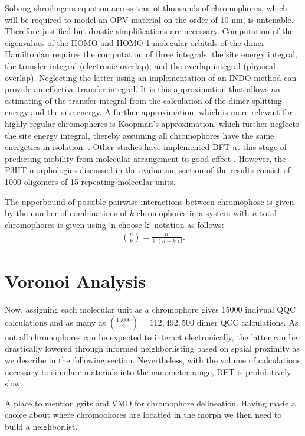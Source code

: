 Solving shrodingers equation across tens of thousands of 
chromophores, which will be required to model an OPV material on the order of 10 nm, is untenable. Therefore
justified but drastic simplifications are necessary. Computation of the eigenvalues of the HOMO and HOMO-1
molecular orbitals of the dimer Hamiltonian requires the computation of three integrals: 
the site energy integral, the transfer integral (electronic overlap), and the overlap integral (physical
overlap). Neglecting the latter using an implementation of an INDO method can provide an effective transfer
integral. It is this approximation that allows an estimating of the transfer integral from the calculation of
the dimer splitting energy and the site energy. A further approximation, which is more relevant for highly regular chromopheres is Koopman's
approximation, which further neglects the site energy integral, thereby assuming all chromophores have the same
energetics in isolation.  \cite{Huang2005b}. Other studies have implemented DFT at this stage of predicting
mobility from molecular arrangement to good effect \cite{Deng2004}. However, the P3HT morphologies discussed in the evaluation section of the results
consist of 1000 oligomers of 15 repeating molecular units. 

The upperbound of possible pairwise interactions between chromophose is given by the number of combinations of
$k$ chromophores in a system with $n$ total chromophores is given using `n choose k' notation as follows:
\begin{align}
    {n \choose k} =  \frac{n!}{k!(n-k)!}.
\end{align}

\section{Voronoi Analysis}

Now, assigning each molecular unit as a chromophore
gives 15000 indivual QQC calculations and as many as ${15000 \choose 2} = 112,492,500$
dimer QCC calculations. As not all chromophores can be expected to interact electronically,
the latter can be drastically lowered through informed neighborlisting based on spaial proximity as we describe
in the following section. Nevertheless, with the volume of calculations necessary to simulate materials into the
nanometer range, DFT is prohibitively slow. 


A place to mention grits and VMD for chromophore delineation. Having made a choice about where chromoohores
are locatied in the morph we then need to build a neighborlist. 


